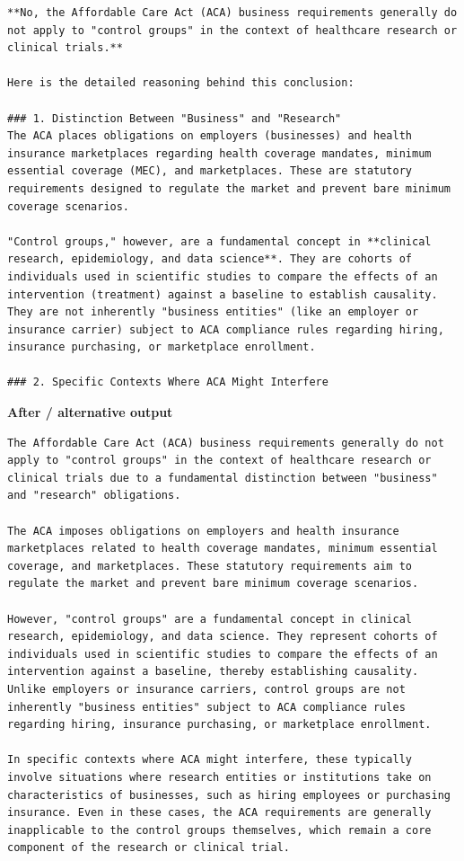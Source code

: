 \begin{Verbatim}
**No, the Affordable Care Act (ACA) business requirements generally do not apply to "control groups" in the context of healthcare research or clinical trials.**

Here is the detailed reasoning behind this conclusion:

### 1. Distinction Between "Business" and "Research"
The ACA places obligations on employers (businesses) and health insurance marketplaces regarding health coverage mandates, minimum essential coverage (MEC), and marketplaces. These are statutory requirements designed to regulate the market and prevent bare minimum coverage scenarios.

"Control groups," however, are a fundamental concept in **clinical research, epidemiology, and data science**. They are cohorts of individuals used in scientific studies to compare the effects of an intervention (treatment) against a baseline to establish causality. They are not inherently "business entities" (like an employer or insurance carrier) subject to ACA compliance rules regarding hiring, insurance purchasing, or marketplace enrollment.

### 2. Specific Contexts Where ACA Might Interfere
\end{Verbatim}

\textbf{After / alternative output}

\begin{Verbatim}
The Affordable Care Act (ACA) business requirements generally do not apply to "control groups" in the context of healthcare research or clinical trials due to a fundamental distinction between "business" and "research" obligations.

The ACA imposes obligations on employers and health insurance marketplaces related to health coverage mandates, minimum essential coverage, and marketplaces. These statutory requirements aim to regulate the market and prevent bare minimum coverage scenarios.

However, "control groups" are a fundamental concept in clinical research, epidemiology, and data science. They represent cohorts of individuals used in scientific studies to compare the effects of an intervention against a baseline, thereby establishing causality. Unlike employers or insurance carriers, control groups are not inherently "business entities" subject to ACA compliance rules regarding hiring, insurance purchasing, or marketplace enrollment.

In specific contexts where ACA might interfere, these typically involve situations where research entities or institutions take on characteristics of businesses, such as hiring employees or purchasing insurance. Even in these cases, the ACA requirements are generally inapplicable to the control groups themselves, which remain a core component of the research or clinical trial.
\end{Verbatim}

